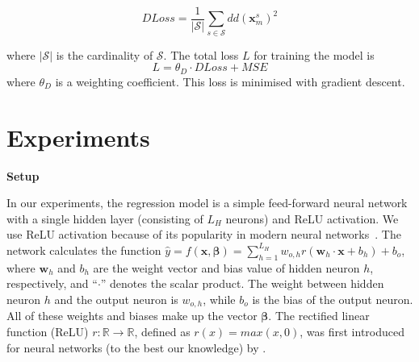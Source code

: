 \documentclass{article}
\newcommand{\kibitz}[2]{\ifnum\Comments=1\textcolor{#1}{#2}\fi}
\newcommand{\kizito}[1]{\kibitz{red} {[Kizito: #1]}}
\newcommand{\enrico}[1]{\kibitz{blue} {[Enrico: #1]}}
\newcommand{\tillman}[1]{\kibitz{darkgreen} {[Tillman: #1]}}
\begin{document}
\begin{equation}
  DLoss = \frac{1}{|\mathcal S|} \sum_{s\in\mathcal S} dd(\mathbf{x}_m^{s})^2
\end{equation}

where $|\mathcal S|$ is the cardinality of $\mathcal S$. The total loss $L$ for training the model is%
\begin{equation}
  L = \theta_{D} \cdot DLoss + MSE
\end{equation}
where $\theta_{D}$ is a weighting coefficient. 
This loss is minimised with gradient descent. 


\section{Experiments}\label{sec:experiments}


\textbf{Setup} 

In our experiments, the regression model is a simple feed-forward neural network with a single hidden layer (consisting of $L_H$ neurons)
and ReLU activation. %
We use ReLU activation because of its popularity in modern neural networks~\cite{goodfellow2016deep}.
The network calculates the function
$\hat{y} = f(\mathbf{x},\boldsymbol{\beta}) =
\sum^{L_H}_{h=1} w_{o,h}  r(\mathbf{w}_{h} \cdot \mathbf{x} + b_{h}) + b_{o}$, where $\mathbf{w}_{h}$ and ${b}_{h}$ are the  weight vector and bias value of hidden neuron $h$, respectively, and ``$\cdot$'' denotes the scalar product.
The weight between hidden neuron $h$ and the output neuron is $w_{o,h}$, while $b_{o}$ is the bias of the output neuron. All of these weights and biases make up the vector $\boldsymbol{\beta}$.  
The rectified linear function (ReLU) $r:\mathbb{R}\rightarrow\mathbb{R}$, defined as $r(x) = max(x,0)$, was first introduced for neural networks (to the best our knowledge) by \cite{fukushima1975relu}. 
\end{document}
